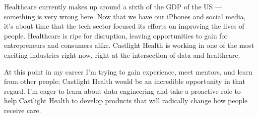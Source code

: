 \documentclass[11pt, a4paper]{awesome-cv} %
\begin{document}
\begin{cvletter}


Healthcare currently makes up around a sixth of the GDP of the US — something is very wrong here. Now that we have our iPhones and social media, it’s about time that the tech sector focused its efforts on improving the lives of people. Healthcare is ripe for disruption, leaving opportunities to gain for entrepreneurs and consumers alike. Castlight Health is working in one of the most exciting industries right now, right at the intersection of data and healthcare.

At this point in my career I’m trying to gain experience, meet mentors, and learn from other people; Castlight Health would be an incredible opportunity in that regard. I’m eager to learn about data engineering and take a proactive role to help Castlight Health to develop products that will radically change how people receive care. 





\end{cvletter}


\makeletterclosing %
\end{document}

